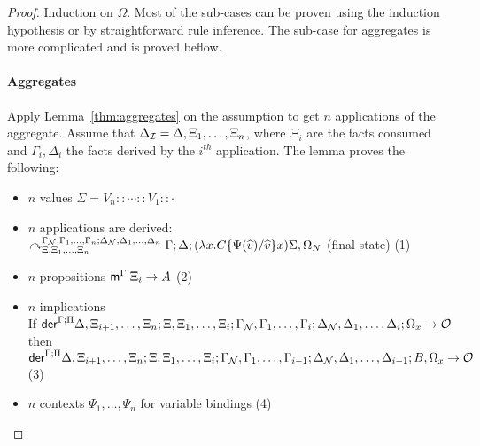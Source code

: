 \begin{proof}\label{sec:derivation_theorem} Induction on $\Omega$. Most of the
sub-cases can be proven using the induction hypothesis or by straightforward
rule inference. The sub-case for aggregates is more
complicated and is proved beflow.

\paragraph{Aggregates} Apply Lemma~\ref{thm:aggregates} on the assumption to get
$n$ applications of the aggregate. Assume that $\Delta_{\mathcal{I}} = \Delta, \Xi_1,
\dotsc, \Xi_n$, where $\Xi_i$ are the facts consumed and $\Gamma_i, \Delta_i$
the facts derived by the $i^{th}$ application.  The lemma proves the following:

\begin{itemize}[leftmargin=*]
   \item $n$ values $\Sigma = V_n :: \dotsb :: V_1 :: \cdot$
   \item $n$ applications are derived:\\
   $\curvearrowright_{\Xi, \Xi_1, \dotsc, \Xi_n}^{\Gamma_{\mathcal{N}},
      \Gamma_1, \dotsc, \Gamma_n; \Delta_{\mathcal{N}}, \Delta_1, \dotsc,
         \Delta_n} \Gamma; \Delta; (\lambda x.  C\{\Psi(\widehat{v})/\widehat{v}\} x) \Sigma,
            \Omega_N$ (final state) \hfill (1)
   \item $n$ propositions $\mathsf{m}^{\Gamma} \; \Xi_i \rightarrow A$ \hfill (2)
   \item $n$ implications\\
      If $\mathsf{der}^{\Gamma ; \Pi} \Delta, \Xi_{i+1}, \dotsc, \Xi_{n} ; \Xi, \Xi_1,
         \dotsc, \Xi_i; \Gamma_{\mathcal{N}}, \Gamma_1, \dotsc, \Gamma_i; \Delta_{\mathcal{N}},
            \Delta_1, \dotsc, \Delta_i; \Omega_x \rightarrow \mathcal{O}$ then\\
            \hspace*{0.5cm} $\mathsf{der}^{\Gamma ; \Pi} \Delta, \Xi_{i+1}, \dotsc, \Xi_{n} ; \Xi, \Xi_1,
            \dotsc, \Xi_i; \Gamma_{\mathcal{N}}, \Gamma_1, \dotsc, \Gamma_{i-1}; \Delta_{\mathcal{N}},
            \Delta_1, \dotsc, \Delta_{i-1}; B, \Omega_x \rightarrow \mathcal{O}$ \hfill (3)
   \item $n$ contexts $\Psi_1, \dotsc, \Psi_n$ for variable bindings \hfill (4)
\end{itemize}

\newcommand{\outsemm}[3]{#1, \Xi^{*}; #2, \Gamma^{*}; #3, \Delta^{*}}
\newcommand{\aggoutsem}[0]{\outsemm{\Xi, \Xi_1, \dotsc, \Xi_n}{\gammanew, \Gamma_1, \dotsc,
      \Gamma_n}{\deltanew, \Delta_1, \dotsc, \Delta_n}}


\end{proof}

